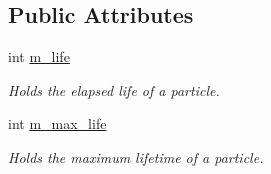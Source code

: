 \subsection*{Public Attributes}
\begin{DoxyCompactItemize}
\item 
\hypertarget{classParticle_a281390be9b1a6d0bf3c7506b01cae304}{
int \hyperlink{classParticle_a281390be9b1a6d0bf3c7506b01cae304}{m\_\-life}}
\label{classParticle_a281390be9b1a6d0bf3c7506b01cae304}

\begin{DoxyCompactList}\small\item\em Holds the elapsed life of a particle. \item\end{DoxyCompactList}\item 
\hypertarget{classParticle_a14dfa07ffad243498ec4c4ae536e74ed}{
int \hyperlink{classParticle_a14dfa07ffad243498ec4c4ae536e74ed}{m\_\-max\_\-life}}
\label{classParticle_a14dfa07ffad243498ec4c4ae536e74ed}

\begin{DoxyCompactList}\small\item\em Holds the maximum lifetime of a particle. \item\end{DoxyCompactList}\end{DoxyCompactItemize}
